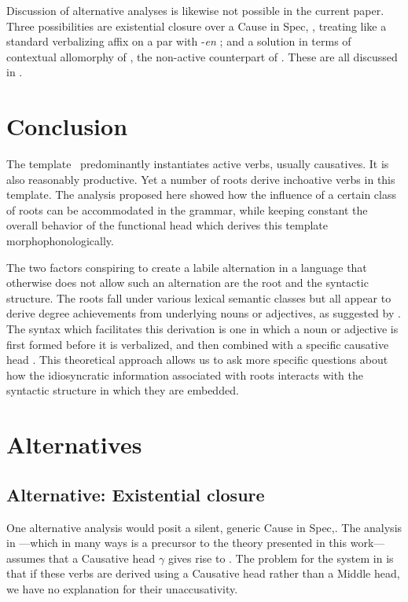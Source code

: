 Discussion of alternative analyses is likewise not possible in the current paper. Three possibilities are existential closure over a Cause in Spec,{\vd} \citep{doron03}, treating {\thif} like a standard verbalizing affix on a par with -\emph{en} \citep{borer91}; and a solution in terms of contextual allomorphy of {\vz}, the non-active counterpart of {\vd}. These are all discussed in \citet[81]{kastner16phd}.


\section{Conclusion}

The template \thif~predominantly instantiates active verbs, usually causatives. It is also reasonably productive. Yet a number of roots derive inchoative verbs in this template. The analysis proposed here showed how the influence of a certain class of roots can be accommodated in the grammar, while keeping constant the overall behavior of the functional head which derives this template morphophonologically.

The two factors conspiring to create a labile alternation in a language that otherwise does not allow such an alternation are the root and the syntactic structure. The roots fall under various lexical semantic classes but all appear to derive degree achievements from underlying nouns or adjectives, as suggested by \cite{lev16}. The syntax which facilitates this derivation is one in which a noun or adjective is first formed before it is verbalized, and then combined with a specific causative head {\vd}. This theoretical approach allows us to ask more specific questions about how the idiosyncratic information associated with roots interacts with the syntactic structure in which they are embedded.


\section{Alternatives}
	\subsection{Alternative: Existential closure}
One alternative analysis would posit a silent, generic Cause in Spec,\vd. The analysis in \citet[61]{doron03}---which in many ways is a precursor to the theory presented in this work---assumes that a Causative head $\gamma$ gives rise to \thif. The problem for the system in \cite{doron03} is that if these verbs are derived using a Causative head rather than a Middle head, we have no explanation for their unaccusativity.

